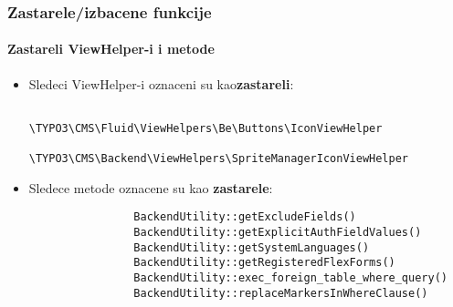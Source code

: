 \begin{frame}[fragile]
	\frametitle{Zastarele/izbacene funkcije}
	\framesubtitle{Zastareli ViewHelper-i i metode}


	\begin{itemize}

		\item Sledeci ViewHelper-i oznaceni su kao\textbf{zastareli}:

			\begin{lstlisting}
				\TYPO3\CMS\Fluid\ViewHelpers\Be\Buttons\IconViewHelper
				\TYPO3\CMS\Backend\ViewHelpers\SpriteManagerIconViewHelper
			\end{lstlisting}

		\item Sledece metode oznacene su kao \textbf{zastarele}:

			\begin{lstlisting}
				BackendUtility::getExcludeFields()
				BackendUtility::getExplicitAuthFieldValues()
				BackendUtility::getSystemLanguages()
				BackendUtility::getRegisteredFlexForms()
				BackendUtility::exec_foreign_table_where_query()
				BackendUtility::replaceMarkersInWhereClause()
			\end{lstlisting}

	\end{itemize}

\end{frame}

